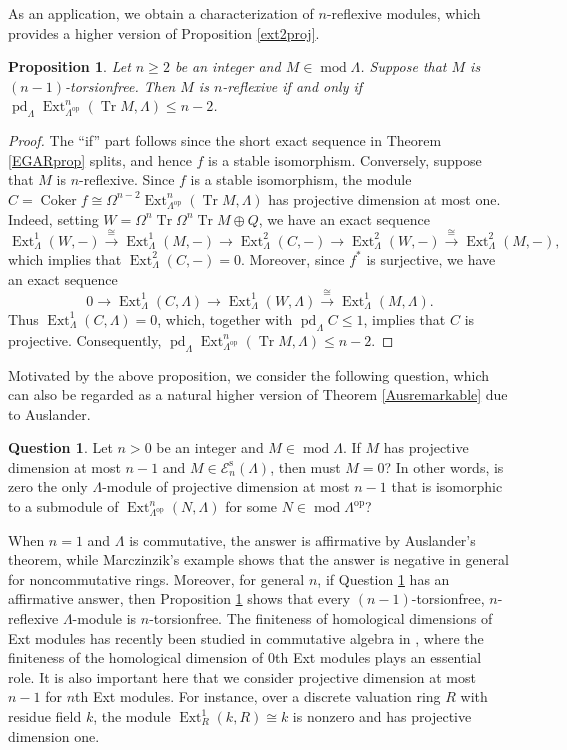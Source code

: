 \documentclass{amsart}
\newtheorem{prop}[thm]{Proposition}
\theoremstyle{definition}
\newtheorem{ques}[thm]{Question}
\theoremstyle{remark}
\numberwithin{equation}{thm}
\def\Cok{\operatorname{Coker}}
\def\E{\mathcal{E}}
\def\Ext{\operatorname{Ext}}
\def\ge{\geqslant}
\def\le{\leqslant}
\def\mod{\operatorname{mod}}
\def\pd{\operatorname{pd}}
\def\syz{\Omega}
\def\tr{\operatorname{Tr}}
\begin{document}
As an application, we obtain a characterization of $n$-reflexive modules, which provides a higher version of Proposition \ref{ext2proj}.

\begin{prop}\label{highernref}
Let $n\ge2$ be an integer and $M\in\mod\Lambda$.
Suppose that $M$ is $(n-1)$-torsionfree.
Then $M$ is $n$-reflexive if and only if $\pd_\Lambda\Ext^n_{\Lambda^{\mathrm{op}}}(\tr M,\Lambda)\le n-2$.
\end{prop}

\begin{proof}
The ``if'' part follows since the short exact sequence in Theorem \ref{EGARprop} splits, and hence $f$ is a stable isomorphism.
Conversely, suppose that $M$ is $n$-reflexive.
Since $f$ is a stable isomorphism, the module $C=\Cok f\cong\syz^{n-2}\Ext^n_{\Lambda^{\mathrm{op}}}(\tr M,\Lambda)$ has projective dimension at most one.
Indeed, setting $W=\syz^n\tr\syz^n\tr M\oplus Q$, we have an exact sequence
$$
\Ext^1_\Lambda(W,-)\xrightarrow{\cong}\Ext^1_\Lambda(M,-)\to\Ext^2_\Lambda(C,-)\to\Ext^2_\Lambda(W,-)\xrightarrow{\cong}\Ext^2_\Lambda(M,-),
$$
which implies that $\Ext^2_\Lambda(C,-)=0$.
Moreover, since $f^\ast$ is surjective, we have an exact sequence
$$
0\to\Ext^1_\Lambda(C,\Lambda)\to\Ext^1_\Lambda(W,\Lambda)\xrightarrow{\cong}\Ext^1_\Lambda(M,\Lambda).
$$
Thus $\Ext^1_\Lambda(C,\Lambda)=0$, which, together with $\pd_\Lambda C\le1$, implies that $C$ is projective.
Consequently, $\pd_\Lambda\Ext^n_{\Lambda^{\mathrm{op}}}(\tr M,\Lambda)\le n-2$.
\end{proof}

Motivated by the above proposition, we consider the following question, which can also be regarded as a natural higher version of Theorem \ref{Ausremarkable} due to Auslander.

\begin{ques}\label{ques2}
Let $n>0$ be an integer and $M\in\mod\Lambda$.
If $M$ has projective dimension at most $n-1$ and $M\in\E_n^{\mathrm{s}}(\Lambda)$, then must $M=0$?
In other words, is zero the only $\Lambda$-module of projective dimension at most $n-1$ that is isomorphic to a submodule of $\Ext^n_{\Lambda^{\mathrm{op}}}(N,\Lambda)$ for some $N\in\mod\Lambda^{\mathrm{op}}$?
\end{ques}

When $n=1$ and $\Lambda$ is commutative, the answer is affirmative by Auslander's theorem, while Marczinzik's example \cite{Marc} shows that the answer is negative in general for noncommutative rings.
Moreover, for general $n$, if Question \ref{ques2} has an affirmative answer, then Proposition \ref{highernref} shows that every $(n-1)$-torsionfree, $n$-reflexive $\Lambda$-module is $n$-torsionfree.
The finiteness of homological dimensions of Ext modules has recently been studied in commutative algebra in \cite{HJM,KimExt}, where the finiteness of the homological dimension of $0$th Ext modules plays an essential role.
It is also important here that we consider projective dimension at most $n-1$ for $n$th Ext modules.
For instance, over a discrete valuation ring $R$ with residue field $k$, the module $\Ext^1_R(k,R)\cong k$ is nonzero and has projective dimension one.
\end{document}
